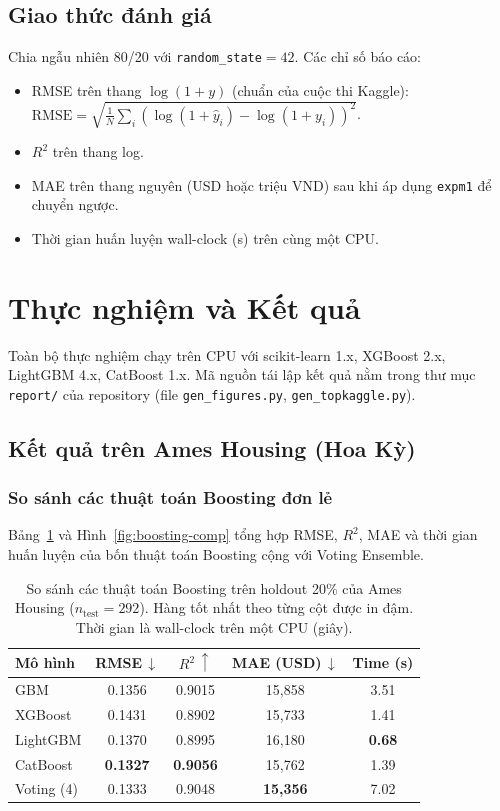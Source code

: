 \documentclass[sigconf,nonacm]{acmart}
\begin{document}
\subsection{Giao thức đánh giá}

Chia ngẫu nhiên 80/20 với \texttt{random\_state}$=42$. Các chỉ số
báo cáo:
\begin{itemize}
\item RMSE trên thang $\log(1+y)$ (chuẩn của cuộc thi Kaggle):
  $\text{RMSE} = \sqrt{\tfrac{1}{N}\sum_i (\log(1+\hat{y}_i) -
  \log(1+y_i))^2}$.
\item $R^2$ trên thang log.
\item MAE trên thang nguyên (USD hoặc triệu VND) sau khi áp dụng
  \texttt{expm1} để chuyển ngược.
\item Thời gian huấn luyện wall-clock (s) trên cùng một CPU.
\end{itemize}

\section{Thực nghiệm và Kết quả}\label{sec:experiments}

Toàn bộ thực nghiệm chạy trên CPU với scikit-learn 1.x, XGBoost 2.x,
LightGBM 4.x, CatBoost 1.x. Mã nguồn tái lập kết quả nằm trong thư
mục \texttt{report/} của repository (file
\texttt{gen\_figures.py}, \texttt{gen\_topkaggle.py}).

\subsection{Kết quả trên Ames Housing (Hoa Kỳ)}

\subsubsection{So sánh các thuật toán Boosting đơn lẻ}
Bảng~\ref{tab:boosting} và Hình~\ref{fig:boosting-comp} tổng hợp
RMSE, $R^2$, MAE và thời gian huấn luyện của bốn thuật toán Boosting
cộng với Voting Ensemble.

\begin{table}[t]
\caption{So sánh các thuật toán Boosting trên holdout 20\% của Ames
  Housing ($n_\text{test}=292$). Hàng tốt nhất theo từng cột được in
  đậm. Thời gian là wall-clock trên một CPU (giây).}
\label{tab:boosting}
\centering
\small
\begin{tabular}{lcccc}
\toprule
Mô hình & RMSE\,$\downarrow$ & $R^2\,\uparrow$ & MAE (USD)\,$\downarrow$
        & Time (s) \\
\midrule
GBM             & 0.1356 & 0.9015 & 15{,}858 & 3.51 \\
XGBoost         & 0.1431 & 0.8902 & 15{,}733 & 1.41 \\
LightGBM        & 0.1370 & 0.8995 & 16{,}180 & \textbf{0.68} \\
CatBoost        & \textbf{0.1327} & \textbf{0.9056} & 15{,}762 & 1.39 \\
\midrule
Voting (4) & 0.1333 & 0.9048 & \textbf{15{,}356} & 7.02 \\
\bottomrule
\end{tabular}
\end{table}
\end{document}

